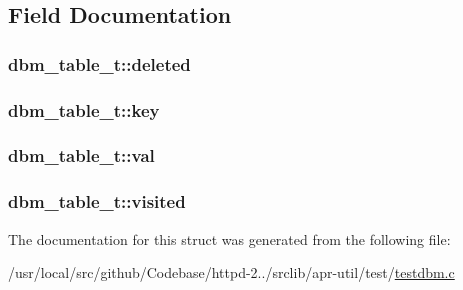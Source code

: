 \subsection{Field Documentation}
\subsubsection[{\texorpdfstring{deleted}{deleted}}]{ dbm\+\_\+table\+\_\+t\+::deleted}\hypertarget{structdbm__table__t_a9bc058ae285d64795327cb4ef086792b}{}\label{structdbm__table__t_a9bc058ae285d64795327cb4ef086792b}
\subsubsection[{\texorpdfstring{key}{key}}]{ dbm\+\_\+table\+\_\+t\+::key}\hypertarget{structdbm__table__t_a0533b8a8cbffb533bdd2c11309bfef71}{}\label{structdbm__table__t_a0533b8a8cbffb533bdd2c11309bfef71}
\subsubsection[{\texorpdfstring{val}{val}}]{ dbm\+\_\+table\+\_\+t\+::val}\hypertarget{structdbm__table__t_a27fe01c35a227d5d012524d7748366a7}{}\label{structdbm__table__t_a27fe01c35a227d5d012524d7748366a7}
\subsubsection[{\texorpdfstring{visited}{visited}}]{ dbm\+\_\+table\+\_\+t\+::visited}\hypertarget{structdbm__table__t_aff3d4175910cee9991ce3e89ad29e5fc}{}\label{structdbm__table__t_aff3d4175910cee9991ce3e89ad29e5fc}


The documentation for this struct was generated from the following file\+:\begin{DoxyCompactItemize}
\item 
/usr/local/src/github/\+Codebase/httpd-\/2../srclib/apr-\/util/test/\hyperlink{testdbm_8c}{testdbm.\+c}\end{DoxyCompactItemize}

